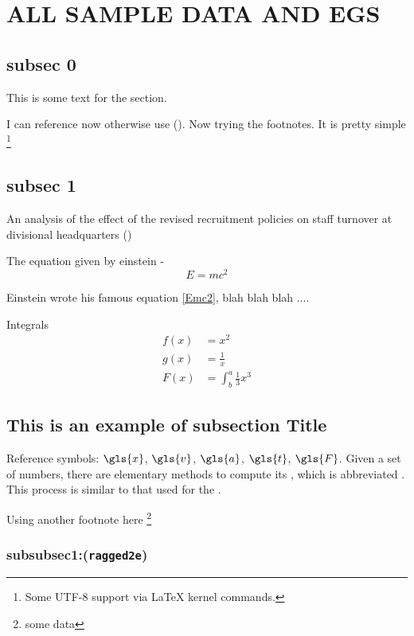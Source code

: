 \documentclass{article}
\begin{document}
\section{ALL SAMPLE DATA AND EGS}
\subsection{subsec 0}
This is some text for the section.

I can reference now otherwise use (\citet{dirac}). Now trying the footnotes. 
It is pretty simple \footnote{Some UTF-8 support via \LaTeX{} kernel commands.}

\subsection{subsec 1}
An analysis of the effect of the revised recruitment policies on staff turnover at divisional headquarters (\citet{einstein})

The equation given by einstein - 
\begin{equation}\label{Emc2}
E=mc^2
\end{equation}

Einstein wrote his famous equation \eqref{Emc2}, blah blah blah ....

Integrals
\begin{align*}
  f(x) &= x^2\\
  g(x) &= \frac{1}{x}\\
  F(x) &= \int^a_b \frac{1}{3}x^3
\end{align*}

\subsection{This is an example of subsection Title}
Reference symbols: $\gls{x}$, $\gls{v}$, $\gls{a}$, $\gls{t}$, $\gls{F}$.
Given a set of numbers, there are elementary methods to compute its , which is abbreviated . This process is similar to that used for the .

Using another footnote here \footnote{some data}

\subsubsection{subsubsec1:(\texttt{ragged2e})}

\begin{Center}
\blindtext[1]
\end{Center}
\end{document}
